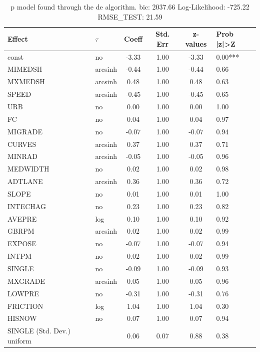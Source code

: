 \begin{table}
	\caption{p model found through the de algorithm. bic: 2037.66 Log-Likelihood: -725.22 RMSE_TEST: 21.59}
	\begin{center}
		\begin{tabular}{|l|l|c|c|c|l|}
			\hline
			Effect & $\tau$ & Coeff & Std. Err & z-values & Prob |z|>Z \\
			\hline
			const & no & -3.33 & 1.00 & -3.33 & 0.00*** \\
			\hline
			MIMEDSH & arcsinh & -0.44 & 1.00 & -0.44 & 0.66 \\
			\hline
			MXMEDSH & arcsinh & 0.48 & 1.00 & 0.48 & 0.63 \\
			\hline
			SPEED & arcsinh & -0.45 & 1.00 & -0.45 & 0.65 \\
			\hline
			URB & no & 0.00 & 1.00 & 0.00 & 1.00 \\
			\hline
			FC & no & 0.04 & 1.00 & 0.04 & 0.97 \\
			\hline
			MIGRADE & no & -0.07 & 1.00 & -0.07 & 0.94 \\
			\hline
			CURVES & arcsinh & 0.37 & 1.00 & 0.37 & 0.71 \\
			\hline
			MINRAD & arcsinh & -0.05 & 1.00 & -0.05 & 0.96 \\
			\hline
			MEDWIDTH & no & 0.02 & 1.00 & 0.02 & 0.98 \\
			\hline
			ADTLANE & arcsinh & 0.36 & 1.00 & 0.36 & 0.72 \\
			\hline
			SLOPE & no & 0.01 & 1.00 & 0.01 & 1.00 \\
			\hline
			INTECHAG & no & 0.23 & 1.00 & 0.23 & 0.82 \\
			\hline
			AVEPRE & log & 0.10 & 1.00 & 0.10 & 0.92 \\
			\hline
			GBRPM & arcsinh & 0.02 & 1.00 & 0.02 & 0.99 \\
			\hline
			EXPOSE & no & -0.07 & 1.00 & -0.07 & 0.94 \\
			\hline
			INTPM & no & 0.02 & 1.00 & 0.02 & 0.99 \\
			\hline
			SINGLE & no & -0.09 & 1.00 & -0.09 & 0.93 \\
			\hline
			MXGRADE & arcsinh & 0.05 & 1.00 & 0.05 & 0.96 \\
			\hline
			LOWPRE & no & -0.31 & 1.00 & -0.31 & 0.76 \\
			\hline
			FRICTION & log & 1.04 & 1.00 & 1.04 & 0.30 \\
			\hline
			HISNOW & no & 0.07 & 1.00 & 0.07 & 0.94 \\
			\hline
			SINGLE (Std. Dev.) uniform &  & 0.06 & 0.07 & 0.88 & 0.38 \\

\end{tabular}
\end{center}
\end{table}
